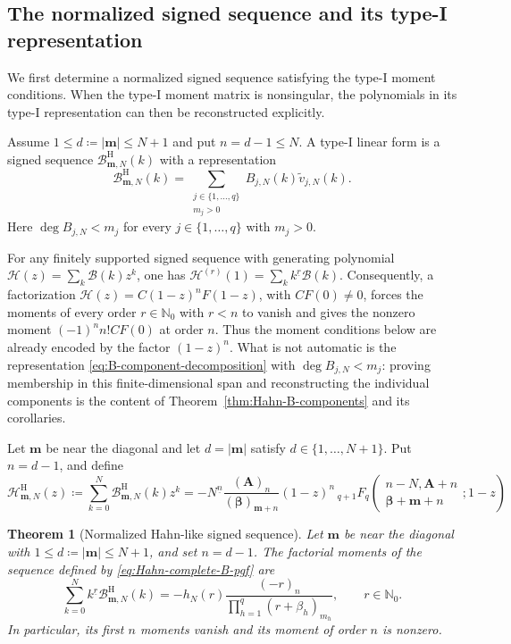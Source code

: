 \documentclass[10pt]{amsart}
\newcommand{\Nzero}{\mathbb N_0}
\newcommand{\A}{\boldsymbol A}
\newcommand{\bbeta}{\boldsymbol\beta}
\newcommand{\mm}{\boldsymbol m}
\newcommand{\abs}[1]{\lvert#1\rvert}
\newcommand{\fall}[2]{#1^{\underline{#2}}}
\newcommand{\pFq}[5]{{}_{#1}F_{#2}\!\left(\begin{matrix}#3\\#4\end{matrix};#5\right)}
\theoremstyle{plain}
\newtheorem{theorem}{Theorem}[section]
\theoremstyle{definition}
\theoremstyle{remark}
\begin{document}
\subsection{The normalized signed sequence and its type-I representation}

We first determine a normalized signed sequence satisfying the type-I
moment conditions. When the type-I moment matrix is nonsingular, the
polynomials in its type-I representation can then be reconstructed
explicitly.

Assume \(1\le d\coloneq\abs\mm\le N+1\) and put
\(n=d-1\le N\). A type-I linear form is a signed
sequence \(\mathcal B_{\mm,N}^{\mathrm H}(k)\) with a representation
\begin{equation}
 \mathcal B_{\mm,N}^{\mathrm H}(k)
 =\sum_{\substack{j\in\{1,\ldots,q\}\\m_j>0}}
 B_{j,N}(k)\widetilde v_{j,N}(k).
 \label{eq:B-component-decomposition}
\end{equation}
Here \(\deg B_{j,N}<m_j\) for every
\(j\in\{1,\ldots,q\}\) with \(m_j>0\).

For any finitely supported signed sequence with generating polynomial
\(\mathcal H(z)=\sum_k\mathcal B(k)z^k\), one has
\(\mathcal H^{(r)}(1)=\sum_k\fall{k}{r}\mathcal B(k)\).
Consequently, a factorization
\(\mathcal H(z)=C(1-z)^nF(1-z)\), with \(CF(0)\ne0\), forces the moments
of every order \(r\in\Nzero\) with \(r<n\) to vanish and gives the nonzero moment
\((-1)^n n!CF(0)\) at order \(n\).  Thus the moment conditions below are
already encoded by the factor \((1-z)^n\).  What is not automatic is the
representation \eqref{eq:B-component-decomposition} with
\(\deg B_{j,N}<m_j\): proving membership in this finite-dimensional span
and reconstructing the individual components is the content of
Theorem~\ref{thm:Hahn-B-components} and its corollaries.

Let \(\mm\) be near the diagonal and let \(d=\abs\mm\) satisfy
\(d\in\{1,\ldots,N+1\}\). Put \(n=d-1\), and define
\begin{equation}
 \mathcal H^{\mathrm H}_{\mm,N}(z)
 \coloneq\sum_{k=0}^N\mathcal B_{\mm,N}^{\mathrm H}(k)z^k
 =-\fall{N}{n}\frac{(\A)_n}{(\bbeta)_{\mm+n}}(1-z)^n
 \,\pFq{q+1}{q}{n-N,\A+n}{\bbeta+\mm+n}{1-z}
 \label{eq:Hahn-complete-B-pgf}
\end{equation}

\begin{theorem}[Normalized Hahn-like signed sequence]
\label{thm:Hahn-complete-B}
Let \(\mm\) be near the diagonal with
\(1\le d\coloneq\abs\mm\le N+1\), and set \(n=d-1\). The
factorial moments of the sequence defined by
\eqref{eq:Hahn-complete-B-pgf} are
\begin{equation}
 \sum_{k=0}^N\fall{k}{r}\mathcal B_{\mm,N}^{\mathrm H}(k)
 =-h_N(r)\frac{(-r)_n}
 {\prod_{h=1}^q(r+\beta_h)_{m_h}},
 \qquad r\in\Nzero.
 \label{eq:Hahn-complete-B-moments}
\end{equation}
In particular, its first \(n\) moments vanish and its moment of order \(n\)
is nonzero.
\end{theorem}
\end{document}
